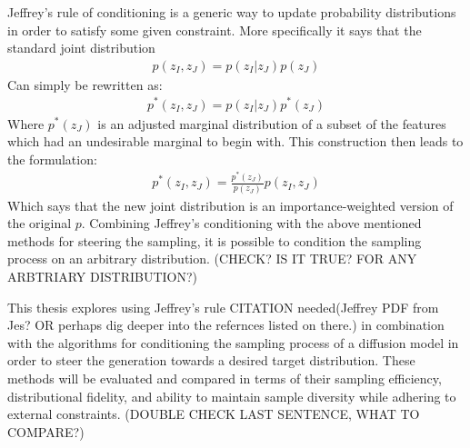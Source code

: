 Jeffrey's rule of conditioning is a generic way to update probability distributions in order to satisfy some given constraint. More specifically it says that the standard joint distribution
\begin{align*}
    p(z_I, z_J) = p(z_I | z_J)p(z_J)
\end{align*}
Can simply be rewritten as:
\begin{align*}
    p^*(z_I, z_J) = p(z_I | z_J)p^*(z_J)
\end{align*}
Where $p^*(z_J)$ is an adjusted marginal distribution of a subset of the features which had an undesirable marginal to begin with. This construction then leads to the formulation:
\begin{align*}
    p^*(z_I, z_J) = \frac{p^*(z_J)}{p(z_J)}p(z_I,z_J)
\end{align*}
Which says that the new joint distribution is an importance-weighted version of the original $p$. 
Combining Jeffrey's conditioning with the above mentioned methods for steering the sampling, it is possible to condition the sampling process on an arbitrary distribution. (CHECK? IS IT TRUE? FOR ANY ARBTRIARY DISTRIBUTION?)

This thesis explores using Jeffrey's rule CITATION needed(Jeffrey PDF from Jes? OR perhaps dig deeper into the refernces listed on there.) in combination with the algorithms for conditioning the sampling process of a diffusion model in order to steer the generation towards a desired target distribution. These methods will be evaluated and compared in terms of their sampling efficiency, distributional fidelity, and ability to maintain sample diversity while adhering to external constraints. (DOUBLE CHECK LAST SENTENCE, WHAT TO COMPARE?)
